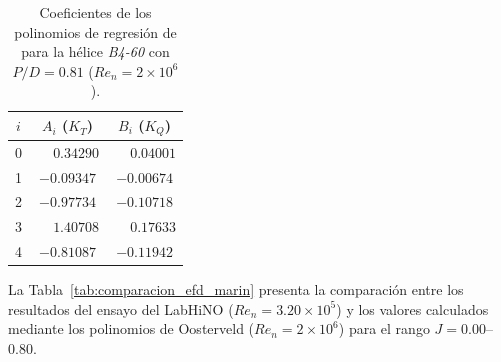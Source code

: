 \begin{table}[htpb]
\centering
\caption{Coeficientes de los polinomios de regresión de \citet{oosterveld1975} para la hélice \textit{B4-60} con $P/D = 0.81$ ($Re_n = 2 \times 10^6$).}
\label{tab:coef_polinomios_b460}
\begin{tabular}{ccc}
\hline
$i$ & $A_i$ ($K_T$) & $B_i$ ($K_Q$) \\
\hline
0 & $\phantom{-}0.34290$ & $\phantom{-}0.04001$ \\
1 & $-0.09347$ & $-0.00674$ \\
2 & $-0.97734$ & $-0.10718$ \\
3 & $\phantom{-}1.40708$ & $\phantom{-}0.17633$ \\
4 & $-0.81087$ & $-0.11942$ \\
\hline
\end{tabular}
\end{table}

La Tabla~\ref{tab:comparacion_efd_marin} presenta la comparación entre los resultados del ensayo del LabHiNO ($Re_n = 3.20 \times 10^5$) y los valores calculados mediante los polinomios de Oosterveld ($Re_n = 2 \times 10^6$) para el rango $J = 0.00$--$0.80$.


